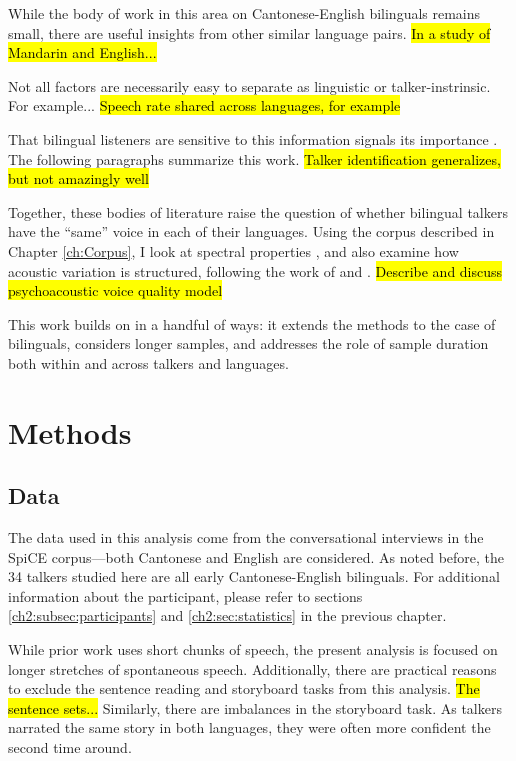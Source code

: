 While the body of work in this area on Cantonese-English bilinguals remains small, there are useful insights from other similar language pairs. \hl{In a study of Mandarin and English...}

Not all factors are necessarily easy to separate as linguistic or talker-instrinsic. For example... \hl{Speech rate shared across languages, for example}

That bilingual listeners are sensitive to this information signals its importance \citep{orena_2019_identifying,fricke_2016_phonetic}. The following paragraphs summarize this work.
\hl{Talker identification generalizes, but not amazingly well} %


Together, these bodies of literature raise the question of whether bilingual talkers have the ``same'' voice in each of their languages. Using the corpus described in Chapter \ref{ch:Corpus}, I look at spectral properties \citep{cheng_2020_f0,altenberg_2006_f0, ryabov_2016_self,ng_2012_ltas}, and also examine how acoustic variation is structured, following the work of \citet{kreiman_2014_theory} and \citet{lee_2019_acoustic}. \hl{Describe and discuss psychoacoustic voice quality model}

This work builds on \citet{lee_2019_acoustic} in a handful of ways: it extends the methods to the case of bilinguals, considers longer samples, and addresses the role of sample duration both within and across talkers and languages. 

\section{Methods}\label{ch3:sec:methods}
\subsection{Data}\label{ch3:sec:data}
The data used in this analysis come from the conversational interviews in the SpiCE corpus---both Cantonese and English are considered. As noted before, the 34 talkers studied here are all early Cantonese-English bilinguals. For additional information about the participant, please refer to sections \ref{ch2:subsec:participants} and \ref{ch2:sec:statistics} in the previous chapter. 

While prior work uses short chunks of speech, the present analysis is focused on longer stretches of spontaneous speech. Additionally, there are practical reasons to exclude the sentence reading and storyboard tasks from this analysis. \hl{The sentence sets...} Similarly, there are imbalances in the storyboard task. As talkers narrated the same story in both languages, they were often more confident the second time around. 

